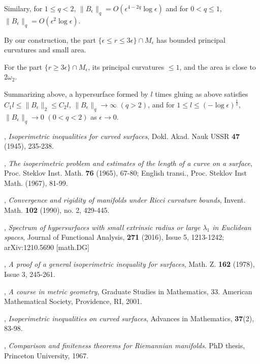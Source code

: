 \documentclass{amsart}
\numberwithin{equation}{section}
\theoremstyle{remark}
\renewcommand{\(}{\left(}
\renewcommand{\)}{\right)}
\renewcommand{\~}{\tilde}
\renewcommand{\-}{\overline}
\newcommand{\e}{\epsilon}
\newcommand{\ra}{\rightarrow}
\begin{document}
Similary, for $1\le q<2$, $\|B_\epsilon\|_q=O(\epsilon^{4-2q}\log \e)$ and for $0<q\le 1$, $\|B_\epsilon\|_q=O(\epsilon^2\log \e)$.

By our construction, the part $\{\e\leq r\leq 3\e\}\cap M_\e$ has bounded principal curvatures and small area.

For the part $\{r\geq 3\e\}\cap M_\e$, its principal curvatures $\le 1$, and the area is close to $2 \omega_2$.

Summarizing above, a hypersurface formed by $l$ times gluing as above satisfies $C_1 l\le \|B_\e\|_{2}\leq C_2 l$, 
$\|B_\e\|_q \ra \infty$ $(q>2)$, and for $1\le l\le (-\log\e)^{\frac{1}{2}}$,  $\|B_\e\|_q \to 0$ $(0<q<2)$ as $\e\ra 0$.



\begin{thebibliography}{10}
	
	
, {\em	Isoperimetric inequalities for curved surfaces}, Dokl. Akad. Nauk USSR {\bf 47} (1945), 235-238.

, {\em The isoperimetric problem and estimates of the length of a curve on a surface}, Proc. Steklov
Inst. Math. {\bf 76} (1965), 67-80; English transi., Proc. Steklov Inst Math. (1967), 81-99.


, {\em Convergence and rigidity of manifolds under Ricci curvature bounds}, Invent. Math. {\bf 102} (1990), no. 2, 429-445.

, {\em Spectrum of hypersurfaces with small extrinsic radius or large $\lambda_1$ in Euclidean spaces},
Journal of Functional Analysis, {\bf 271} (2016), Issue 5, 1213-1242; arXiv:1210.5690 [math.DG]

, {\em A proof of a general isoperimetric inequality for surfaces}, Math. Z. {\bf 162} (1978), Issue 3, 245-261.

, {\em A course in metric geometry}, Graduate Studies in Mathematics, 33. American Mathematical Society, Providence, RI, 2001.

, {\em Isoperimetric inequalities on curved surfaces}, Advances in Mathematics, {\bf 37}(2), 83-98.

, {\em Comparison and finiteness theorems for Riemannian manifolds}. PhD thesis, Princeton University, 1967.


\end{thebibliography}
\end{document}
